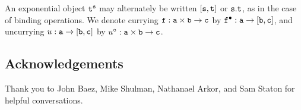 \documentclass[stthol.tex]{subfiles}
\begin{document}
An exponential object $\mathtt{t}^{\mathtt{s}}$ may alternately be written $[\mathtt{s},\mathtt{t}]$ or $\mathtt{s}.\mathtt{t}$, as in the case of binding operations. We denote currying $\mathtt{f}:\mathtt{a}\times \mathtt{b}\to \mathtt{c}$ by $\mathtt{f}^\bullet:\mathtt{a}\to [\mathtt{b},\mathtt{c}]$, and uncurrying $u:\mathtt{a}\to [\mathtt{b},\mathtt{c}]$ by $u^\circ:\mathtt{a}\times \mathtt{b}\to \mathtt{c}$.

\subsection{Acknowledgements}
Thank you to John Baez, Mike Shulman, Nathanael Arkor, and Sam Staton for helpful conversations.
\end{document}

